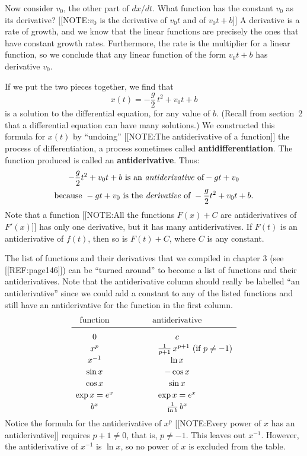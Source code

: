 Now consider $v_0$, the other part of $dx/dt$.  What function has the
constant $v_0$ as its derivative?
[[NOTE:$v_0$ is the derivative  of $v_0t$ and of $v_0t + b$]] 
A derivative is a rate of growth, and we know that the linear functions
are precisely the ones that have constant growth rates.  Furthermore,
the rate is the multiplier for a linear function, so we conclude that
any linear function of the form $v_0 t + b$ has derivative $v_0$.

If we put the two pieces together, we find that 
\[
x(t) = -\dfrac{g}{2} \, t^2 + v_0 t + b
\]
is a solution to the differential equation, for any value of $b$.
(Recall from section~2 that a differential equation can have many
solutions.)  We constructed this formula for $x(t)$ by ``undoing''
[[NOTE:The antiderivative  of a function]]
the process of differentiation, a process sometimes called {\bf
  antidifferentiation}. The function
produced is called an {\bf antiderivative}.
Thus:
\begin{gather*}
-\dfrac{g}{2} t^2 + v_0 t + b 
              \text{ is an \emph{antiderivative} of} -gt + v_0 \\
\text{because }
-gt + v_0 \text{ is the \emph{derivative} of } -\dfrac{g}{2} t^2 + v_0 t + b.
\end{gather*}
Note that a function 
        [[NOTE:All the functions $F(x) +C$ are antiderivatives of $F'(x)$]]
has only one derivative, but it has many antiderivatives.  If $F(t)$ is an antiderivative of $f(t)$, then so is $F(t) + C$, where $C$ is any constant.

The list of functions and their derivatives that we compiled in
chapter 3 (see [[REF:page146]]) can be ``turned around'' to become a list of
functions and their antiderivatives.  Note that the antiderivative
column should really be labelled ``an antiderivative'' since we could
add a constant to any of the listed functions and still have an
antiderivative for the function in the first column.
\addtolength{\arraycolsep}{8pt}
        \[
\begin{array}{cc}
        \mbox{function} & \mbox{antiderivative} \\[2pt] \hline
        \rule{0pt}{14pt} 0 \rule{0pt}{14pt} & c \\[2pt]
        x^p & \hspace*{.6in} \frac{1}{p+1} \, x^{p+1} 
                         \mbox{ (if $p\neq -1$)}\\[2pt]
        x^{-1} & \ln{x} \\[2pt]
        \sin{x} & -\cos{x} \\[2pt]
        \cos{x} & \sin{x} \\[2pt]
        \exp{x} = e^x & \exp{x} = e^x \\[2pt]
        b^x & \frac{1}{\ln{b}}\, b^x 
        \end{array}
\]
        \addtolength{\arraycolsep}{-8pt}%
Notice the formula for the antiderivative of $x^p$ 
[[NOTE:Every power of $x$ has an antiderivative]]
requires $p+1 \neq 0$, that is, $p \neq -1$.  This leaves out
$x^{-1}$.  However, the antiderivative of $x^{-1}$ is $\ln{x}$, so no
power of $x$ is excluded from the table.

